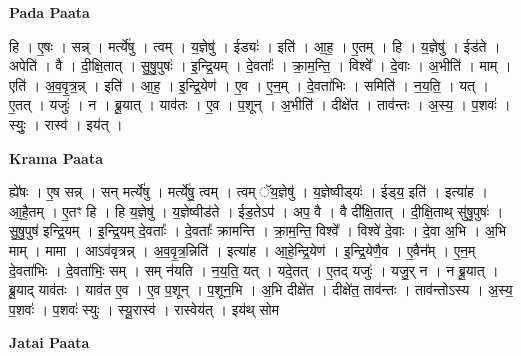 \documentclass[17pt]{extarticle}
\begin{document}
\textbf{Pada Paata} \newline

हि । ए॒षः । सन्न् । मर्त्ये॑षु । त्वम् । य॒ज्ञेषु॑ । ईड्यः॑ । इति॑ । आ॒ह॒ । ए॒तम् । हि । य॒ज्ञेषु॑ । ईड॑ते । अपेति॑ । वै । दी॒क्षि॒तात् । सु॒षु॒पुषः॑ । इ॒न्द्रि॒यम् । दे॒वताः᳚ । क्रा॒म॒न्ति॒ । विश्वे᳚ । दे॒वाः । अ॒भीति॑ । माम् । एति॑ । अ॒व॒वृ॒त्र॒न्न् । इति॑ । आ॒ह॒ । इ॒न्द्रि॒येण॑ । ए॒व । ए॒न॒म् । दे॒वता॑भिः । समिति॑ । न॒य॒ति॒ । यत् । ए॒तत् । यजुः॑ । न । ब्रू॒यात् । याव॑तः । ए॒व । प॒शून् । अ॒भीति॑ । दीक्षे॑त । ताव॑न्तः । अ॒स्य॒ । प॒शवः॑ । स्युः॒ । रास्व॑ । इय॑त् ।  \newline


\textbf{Krama Paata} \newline

ह्ये॑षः । ए॒ष सन्न् । सन् मर्त्ये॑षु । मर्त्ये॑षु॒ त्वम् । त्वम् ॅय॒ज्ञेषु॑ । य॒ज्ञेष्वीड्‍यः॑ । ईड्‍य॒ इति॑ । इत्या॑ह । आ॒है॒तम् । ए॒तꣳ हि । हि य॒ज्ञेषु॑ । य॒ज्ञेष्वीड॑ते । ईड॒तेऽप॑ । अप॒ वै । वै दी᳚क्षि॒तात् । दी॒क्षि॒ताथ् सु॑षु॒पुषः॑ । सु॒षु॒पुष॑ इन्द्रि॒यम् । इ॒न्द्रि॒यम् दे॒वताः᳚ । दे॒वताः᳚ क्रामन्ति । क्रा॒म॒न्ति॒ विश्वे᳚ । विश्वे॑ दे॒वाः । दे॒वा अ॒भि । अ॒भि माम् । मामा । आऽव॑वृत्रन्न् । अ॒व॒वृ॒त्र॒न्निति॑ । इत्या॑ह । आ॒हे॒न्द्रि॒येण॑ । इ॒न्द्रि॒येणै॒व । ए॒वैन᳚म् । ए॒न॒म् दे॒वता॑भिः । दे॒वता॑भिः॒ सम् । सम् न॑यति । न॒य॒ति॒ यत् । यदे॒तत् । ए॒तद् यजुः॑ । यजु॒र् न । न ब्रू॒यात् । ब्रू॒याद् याव॑तः । याव॑त ए॒व । ए॒व प॒शून् । प॒शून॒भि । अ॒भि दीक्षे॑त । दीक्षे॑त॒ ताव॑न्तः । ताव॑न्तोऽस्य । अ॒स्य॒ प॒शवः॑ । प॒शवः॑ स्युः । स्यू॒रास्व॑ । रास्वेय॑त् । इय॑थ् सोम \newline

\textbf{Jatai Paata} \newline
\end{document}

